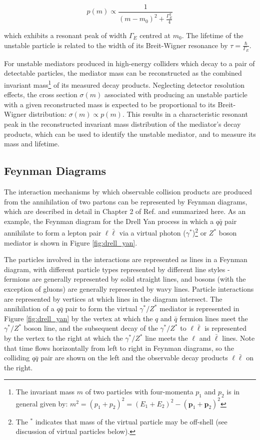\begin{equation}
\label{eq:breit_wigner}
p(m) \propto \frac{1}{(m-m_0)^2 + \frac{\Gamma_E^2}{4}}
\end{equation}

\noindent which exhibits a resonant peak of width \(\Gamma_E\) centred at \(m_0\). The lifetime of the unstable particle is related to the width of its Breit-Wigner resonance by \(\tau = \frac{\hbar}{\Gamma_E}\).

For unstable mediators produced in high-energy colliders which decay to a pair of detectable particles, the mediator mass can be reconstructed as the combined invariant mass\footnote{The invariant mass \(m\) of two particles with four-momenta \(p_1\) and \(p_2\) is in general given by: \(m^2 = (p_1 + p_2)^2 = (E_1+E_2)^2 - (\mathbf{p}_1+\mathbf{p}_2)^2\)} of its measured decay products. Neglecting detector resolution effects, the cross section \(\sigma(m)\) associated with producing an unstable particle with a given reconstructed mass is expected to be proportional to its Breit-Wigner distribution: \(\sigma(m)\propto p(m)\). This results in a characteristic resonant peak in the reconstructed invariant mass distribution of the mediator's decay products, which can be used to identify the unstable mediator, and to measure its mass and lifetime.

\subsection{Feynman Diagrams}

The interaction mechanisms by which observable collision products are produced from the annihilation of two partons can be represented by Feynman diagrams, which are described in detail in Chapter 2 of Ref. \cite{griffiths_2008} and summarized here. As an example, the Feynman diagram for the Drell Yan process in which a \(q\bar{q}\) pair annihilate to form a lepton pair \(\ell\bar{\ell}\) via a virtual photon (\(\gamma^{*}\))\footnote{The \(^{*}\) indicates that mass of the virtual particle may be off-shell (see discussion of virtual particles below).} or \(Z^{*}\) boson mediator is shown in Figure \ref{fig:drell_yan}. 

The particles involved in the interactions are represented as lines in a Feynman diagram, with different particle types represented by different line styles - fermions are generally represented by solid straight lines, and bosons (with the exception of gluons) are generally represented by wavy lines. Particle interactions are represented by vertices at which lines in the diagram intersect. The annihilation of a \(q\bar{q}\) pair to form the virtual \(\gamma^{*}/Z^{*}\) mediator is represented in Figure \ref{fig:drell_yan} by the vertex at which the \(q\) and \(\bar{q}\) fermion lines meet the \(\gamma^{*}/Z^{*}\) boson line, and the subsequent decay of the  \(\gamma^{*}/Z^{*}\) to \(\ell\bar{\ell}\) is represented by the vertex to the right at which the \(\gamma^{*}/Z^{*}\) line meets the \(\ell\) and \(\bar{\ell}\) lines. Note that time flows horizontally from left to right in Feynman diagrams, so the colliding \(q\bar{q}\) pair are shown on the left and the observable decay products \(\ell\bar{\ell}\) on the right.

